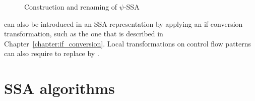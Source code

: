 \begin{figure}[h]
\footnotesize
{}\hfill
{} \hfill
{} \hfill
{}
\caption{Construction and renaming of $\psi$-SSA}
\label{fig:psi_ssa_construct}
\end{figure}


\psifuns can also be introduced in an SSA representation by
applying an if-conversion transformation, such as the one that is
described in Chapter~\ref{chapter:if_conversion}. Local transformations
on control flow patterns can also require to replace \phifuns
by \psifuns.

\section{SSA algorithms}



